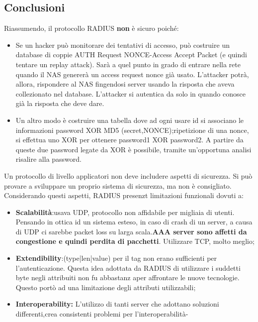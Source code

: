 \documentclass{book}
\theoremstyle{remark}
\begin{document}
\subsection{Conclusioni}
Riassumendo, il protocollo RADIUS \textbf{non} è sicuro poiché:\begin{itemize}
	\item Se un hacker può monitorare dei tentativi di accesso, può costruire un database di coppie AUTH Request NONCE-Access Accept Packet (e quindi tentare un replay attack)\@. Sarà a quel punto in grado di entrare nella rete quando il NAS genererà un access request nonce già usato\@. L'attacker potrà, allora, rispondere al NAS fingendosi server usando la risposta che aveva collezionato nel database\@. L'attacker si autentica da solo in quando conosce già la risposta che deve dare\@.
	\item Un altro modo è costruire una tabella dove ad ogni usare id si associano le informazioni password XOR MD5 (secret,NONCE);\@alla ripetizione di una nonce, si effettua uno XOR per ottenere password1 XOR password2\@. A partire da queste due password legate da XOR è possibile, tramite un'opportuna analisi risalire alla password\@.
\end{itemize}
Un protocollo di livello applicatori non deve includere aspetti di sicurezza\@. Si può provare a sviluppare un proprio sistema di sicurezza, ma non è consigliato\@.
Considerando questi aspetti, RADIUS presenzt limitazioni funzionali dovuti a:\begin{itemize}
	\item \textbf{Scalabilità}:\@RADIUS usava UDP, protocollo non affidabile per migliaia di utenti\@. Pensando in ottica id un sistema esteso, in caso di crash di un server, a causa di UDP ci sarebbe packet loss su larga scala\@.\textbf{AAA server sono affetti da congestione e quindi perdita di pacchetti}\@. Utilizzare TCP, molto meglio;\@
	\item \textbf{Extendibility}:\@(type|len|value) per il tag non erano sufficienti per l'autenticazione\@. Questa idea adottata da RADIUS di utilizzare i suddetti byte negli attribuiti non fu abbastanz aper affrontare le nuove tecnologie\@. Questo portò ad una limitazione degli attributi utilizzabili;\@
	\item \textbf{Interoperability:} L'utilizzo di tanti server che adottano soluzioni differenti,crea consistenti problemi per l'interoperabilità-
\end{itemize}
\end{document}
